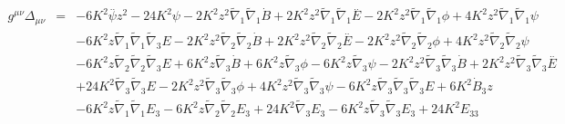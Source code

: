 \documentclass[10pt,letterpaper]{article}
\numberwithin{equation}{section}
\begin{document}
\begin{eqnarray}
\\  \nonumber\\ 
g^{\mu\nu}\Delta_{\mu\nu}&=& -6 K^2 \overset{..}{\psi} z^2 - 24 K^2 \psi - 2 K^2 z^2 \tilde{\nabla}_{1}\tilde{\nabla}_{1}\dot{B} + 2 K^2 z^2 \tilde{\nabla}_{1}\tilde{\nabla}_{1}\overset{..}{E} - 2 K^2 z^2 \tilde{\nabla}_{1}\tilde{\nabla}_{1}\phi + 4 K^2 z^2 \tilde{\nabla}_{1}\tilde{\nabla}_{1}\psi \nonumber \\ 
&& - 6 K^2 z \tilde{\nabla}_{1}\tilde{\nabla}_{1}\tilde{\nabla}_{3}E - 2 K^2 z^2 \tilde{\nabla}_{2}\tilde{\nabla}_{2}\dot{B} + 2 K^2 z^2 \tilde{\nabla}_{2}\tilde{\nabla}_{2}\overset{..}{E} - 2 K^2 z^2 \tilde{\nabla}_{2}\tilde{\nabla}_{2}\phi + 4 K^2 z^2 \tilde{\nabla}_{2}\tilde{\nabla}_{2}\psi \nonumber \\ 
&& - 6 K^2 z \tilde{\nabla}_{2}\tilde{\nabla}_{2}\tilde{\nabla}_{3}E + 6 K^2 z \tilde{\nabla}_{3}\dot{B} + 6 K^2 z \tilde{\nabla}_{3}\phi - 6 K^2 z \tilde{\nabla}_{3}\psi - 2 K^2 z^2 \tilde{\nabla}_{3}\tilde{\nabla}_{3}\dot{B} + 2 K^2 z^2 \tilde{\nabla}_{3}\tilde{\nabla}_{3}\overset{..}{E} \nonumber \\ 
&& + 24 K^2 \tilde{\nabla}_{3}\tilde{\nabla}_{3}E - 2 K^2 z^2 \tilde{\nabla}_{3}\tilde{\nabla}_{3}\phi + 4 K^2 z^2 \tilde{\nabla}_{3}\tilde{\nabla}_{3}\psi - 6 K^2 z \tilde{\nabla}_{3}\tilde{\nabla}_{3}\tilde{\nabla}_{3}E+6 K^2 \dot{B}_{3} z \nonumber \\ 
&& - 6 K^2 z \tilde{\nabla}_{1}\tilde{\nabla}_{1}E_{3} - 6 K^2 z \tilde{\nabla}_{2}\tilde{\nabla}_{2}E_{3} + 24 K^2 \tilde{\nabla}_{3}E_{3} - 6 K^2 z \tilde{\nabla}_{3}\tilde{\nabla}_{3}E_{3}+24 K^2 E_{33}
\end{eqnarray}
%
%
\newpage
\end{document}

